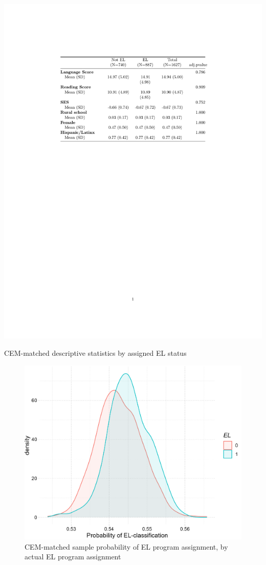 \documentclass[a4paper, 11pt]{article}
\begin{document}
\begin{enumerate}
\begin{table}
	\includegraphics{tables/cem_descriptives.pdf}
		\caption{CEM-matched descriptive statistics by assigned EL status \label{tab:cem}}	
\end{table}


	\begin{figure}
		\begin{center}
			\includegraphics[scale=0.7]{figures/cem1_common_support.png}
			\caption{CEM-matched sample probability of EL program assignment, by actual EL program assignment \label{fig:cem_common}}
		\end{center}
	\end{figure}


\end{enumerate}
\end{document}

